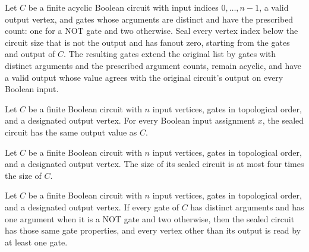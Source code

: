 \begin{theorem}
\label{BoolCircuit.seal_spec}
\leanok
{}
Let $C$ be a finite acyclic Boolean circuit with input indices $0,\ldots,n-1$, a valid
output vertex, and gates whose arguments are distinct and have the prescribed count: one
for a NOT gate and two otherwise. Seal every vertex index below the circuit size that is
not the output and has fanout zero, starting from the gates and output of $C$. The
resulting gates extend the original list by gates with distinct arguments and the
prescribed argument counts, remain acyclic, and have a valid output whose value agrees
with the original circuit's output on every Boolean input.
\end{theorem}

\begin{theorem}
\label{BoolCircuit.DAGCircuit.seal_eval}
\leanok
{}
Let $C$ be a finite Boolean circuit with $n$ input vertices, gates in topological order,
and a designated output vertex. For every Boolean input assignment $x$, the sealed
circuit has the same output value as $C$.
\end{theorem}

\begin{theorem}
\label{BoolCircuit.DAGCircuit.seal_size_le}
\leanok
{}
Let $C$ be a finite Boolean circuit with $n$ input vertices, gates in topological order,
and a designated output vertex. The size of its sealed circuit is at most four times the
size of $C$.
\end{theorem}

\begin{theorem}
\label{BoolCircuit.DAGCircuit.seal_isStrict}
\leanok
{}
Let $C$ be a finite Boolean circuit with $n$ input vertices, gates in topological order,
and a designated output vertex. If every gate of $C$ has distinct arguments and has one
argument when it is a NOT gate and two otherwise, then the sealed circuit has those same
gate properties, and every vertex other than its output is read by at least one gate.
\end{theorem}

